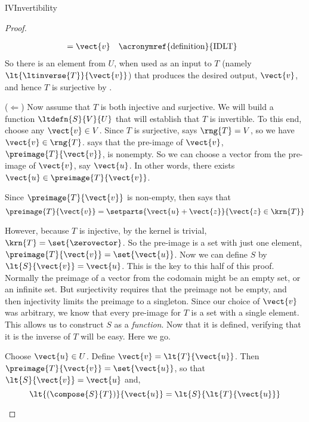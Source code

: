 \begin{subsect}{IV}{Invertibility}
\begin{proof}
\begin{para}
\begin{align*}
&=\vect{v}&&\text{\acronymref{definition}{IDLT}}
\end{align*}
%
So there is an element from $U$, when used as an input to $T$ (namely $\lt{\ltinverse{T}}{\vect{v}}$) that produces the desired output, $\vect{v}$, and hence $T$ is surjective by .\end{para}
%
\begin{para}($\Leftarrow$)  Now assume that $T$ is both injective and surjective.  We will build a function $\ltdefn{S}{V}{U}$ that will establish that $T$ is invertible.  To this end, choose any $\vect{v}\in V$.  Since $T$ is surjective,  says $\rng{T}=V$, so we have $\vect{v}\in\rng{T}$.   says that the pre-image of $\vect{v}$, $\preimage{T}{\vect{v}}$, is nonempty.  So we can choose a vector from the pre-image of $\vect{v}$, say $\vect{u}$.  In other words, there exists $\vect{u}\in\preimage{T}{\vect{v}}$.\end{para}
%
\begin{para}Since $\preimage{T}{\vect{v}}$ is non-empty,  then says that
%
\begin{equation*}
\preimage{T}{\vect{v}}=\setparts{\vect{u}+\vect{z}}{\vect{z}\in\krn{T}}
\end{equation*}
\end{para}
%
\begin{para}However, because $T$ is injective, by  the kernel is trivial, $\krn{T}=\set{\zerovector}$.  So the pre-image is a set with just one element, $\preimage{T}{\vect{v}}=\set{\vect{u}}$.  Now we can define $S$ by $\lt{S}{\vect{v}}=\vect{u}$.  This is the key to this half of this proof.  Normally the preimage of a vector from the codomain might be an empty set, or an infinite set.  But surjectivity requires that the preimage not be empty, and then injectivity limits the preimage to a singleton.  Since our choice of $\vect{v}$ was arbitrary, we know that every pre-image for $T$ is a set with a single element.  This allows us to construct $S$ as a {\em function}.  Now that it is defined, verifying that it is the inverse of $T$ will be easy.  Here we go.\end{para}
%
\begin{para}Choose $\vect{u}\in U$.  Define $\vect{v}=\lt{T}{\vect{u}}$.  Then $\preimage{T}{\vect{v}}=\set{\vect{u}}$, so that $\lt{S}{\vect{v}}=\vect{u}$ and,
%
\begin{equation*}
\lt{\left(\compose{S}{T}\right)}{\vect{u}}
=\lt{S}{\lt{T}{\vect{u}}}

\end{equation*}
\end{para}
\end{proof}
\end{subsect}
